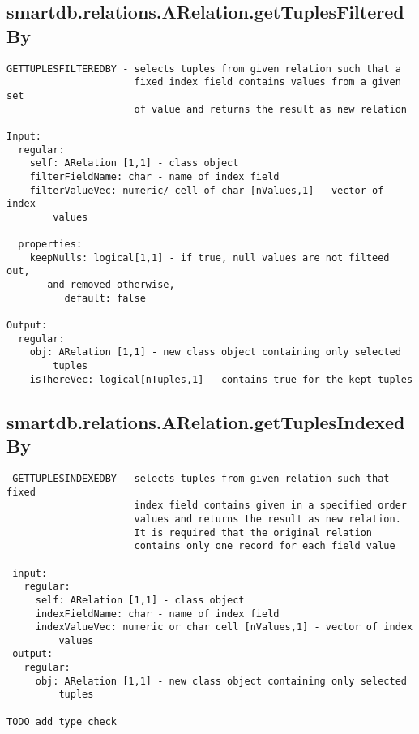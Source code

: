 \subsection{\texorpdfstring{smartdb.relations.ARelation.getTuplesFilteredBy}{getTuplesFilteredBy}}\label{method:smartdb.relations.ARelation.getTuplesFilteredBy}
\begin{verbatim}
GETTUPLESFILTEREDBY - selects tuples from given relation such that a
                      fixed index field contains values from a given set
                      of value and returns the result as new relation

Input:
  regular:
    self: ARelation [1,1] - class object
    filterFieldName: char - name of index field
    filterValueVec: numeric/ cell of char [nValues,1] - vector of index
        values

  properties:
    keepNulls: logical[1,1] - if true, null values are not filteed out,
       and removed otherwise,
          default: false

Output:
  regular:
    obj: ARelation [1,1] - new class object containing only selected
        tuples
    isThereVec: logical[nTuples,1] - contains true for the kept tuples
\end{verbatim}
\subsection{\texorpdfstring{smartdb.relations.ARelation.getTuplesIndexedBy}{getTuplesIndexedBy}}\label{method:smartdb.relations.ARelation.getTuplesIndexedBy}
\begin{verbatim}
 GETTUPLESINDEXEDBY - selects tuples from given relation such that fixed
                      index field contains given in a specified order
                      values and returns the result as new relation.
                      It is required that the original relation
                      contains only one record for each field value

 input:
   regular:
     self: ARelation [1,1] - class object
     indexFieldName: char - name of index field
     indexValueVec: numeric or char cell [nValues,1] - vector of index
         values
 output:
   regular:
     obj: ARelation [1,1] - new class object containing only selected
         tuples

TODO add type check
\end{verbatim}
